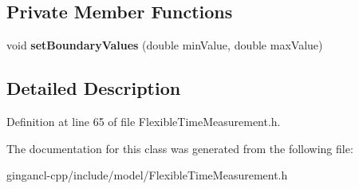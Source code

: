 \subsection*{Private Member Functions}
\begin{CompactItemize}
\item 
void \textbf{setBoundaryValues} (double minValue, double maxValue)\label{classbr_1_1pucrio_1_1telemidia_1_1ginga_1_1ncl_1_1model_1_1time_1_1FlexibleTimeMeasurement_7edb919d4f7a14cf3254df6d184f378c}

\end{CompactItemize}


\subsection{Detailed Description}




Definition at line 65 of file FlexibleTimeMeasurement.h.

The documentation for this class was generated from the following file:\begin{CompactItemize}
\item 
gingancl-cpp/include/model/FlexibleTimeMeasurement.h\end{CompactItemize}
